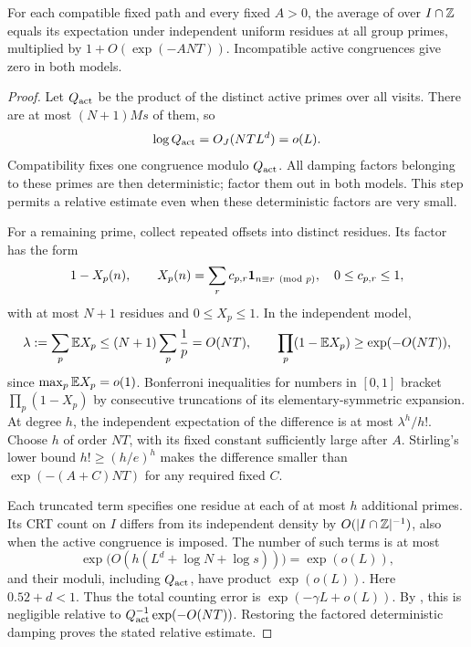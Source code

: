 \begin{lemma}\label{lem:transference-crt}
For each compatible fixed path and every fixed $A>0$, the average
of  over $I\cap\mathbb Z$ equals its
expectation under independent uniform residues at all group
primes, multiplied by $1+O(\exp(-ANT))$.  Incompatible active
congruences give zero in both models.
\end{lemma}

\begin{proof}
Let $Q_{\rm act}$ be the product of the distinct active primes
over all visits.  There are at most $(N+1)Ms$ of them, so
\begin{equation}\label{eq:active-crt-size}
 \log Q_{\rm act}=O_J(NTL^d)=o(L).
\end{equation}
Compatibility fixes one congruence modulo $Q_{\rm act}$.  All
damping factors belonging to these primes are then deterministic;
factor them out in both models.  This step permits a relative
estimate even when these deterministic factors are very small.

For a remaining prime, collect repeated offsets into distinct
residues.  Its factor has the form
\[
 1-X_p(n),\qquad
 X_p(n)=\sum_r c_{p,r}\mathbf 1_{n\equiv r\pmod p},
 \quad 0\le c_{p,r}\le1,
\]
with at most $N+1$ residues and $0\le X_p\le1$.  In the
independent model,
\[
 \lambda:=\sum_p\mathbb E X_p\le(N+1)\sum_p\frac1p=O(NT),
 \qquad \prod_p(1-\mathbb E X_p)\ge\exp(-O(NT)),
\]
since $\max_p\mathbb E X_p=o(1)$.  Bonferroni inequalities for numbers
in $[0,1]$ bracket $\prod_p(1-X_p)$ by consecutive truncations
of its elementary-symmetric expansion.  At degree $h$, the
independent expectation of the difference is at most
$\lambda^h/h!$.  Choose $h$ of order $NT$, with its fixed
constant sufficiently large after $A$.  Stirling's lower bound
$h!\ge(h/e)^h$ makes the difference smaller than
$\exp(-(A+C)NT)$ for any required fixed $C$.

Each truncated term specifies one residue at each of at most
$h$ additional primes.  Its CRT count on $I$ differs from its
independent density by $O(|I\cap\mathbb Z|^{-1})$, also when the
active congruence is imposed.  The number of such terms is at
most
\[
 \exp\big(O(h(L^d+\log N+\log s))\big)=\exp(o(L)),
\]
and their moduli, including $Q_{\rm act}$, have product
$\exp(o(L))$.  Here $0.52+d<1$.  Thus the total counting
error is $\exp(-\gamma L+o(L))$.  By
, this is negligible relative to
$Q_{\rm act}^{-1}\exp(-O(NT))$.  Restoring the factored
deterministic damping proves the stated relative estimate.
\end{proof}

